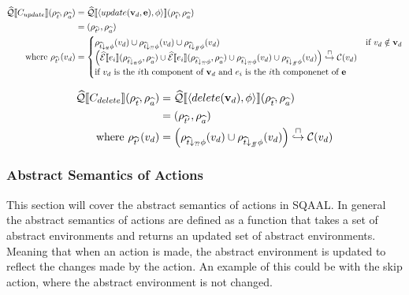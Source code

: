 \begin{align}
    \abssqlsem{C_{update}}(\env{\abstable}, \env{\absvars})
                                              & = \abssqlsem{\langle update(\absattrs, \absexps), \abspred \rangle} (\env{\abstable}, \env{\absvars}) \\
                                              & = (\env{\abstable'}, \env{\absvars})                                                                 \\
    \text{where } \env{\abstable'}(\absattr) & =
    \begin{cases}
        \env{\abstable \downarrow_{\true} \abspred}(\absattr) \cup \env{\abstable \downarrow_{\unknown} \abspred}(\absattr) \cup \env{\abstable \downarrow_{\false} \abspred}(\absattr) & \text{if } \absattr \notin \absattrs \\
        \left( \absexpsem{\absexp{i}}(\env{\abstable \downarrow_{\true} \abspred}, \env{\absvars}) \cup
        \absexpsem{\absexp{i}}(\env{\abstable \downarrow_{\unknown} \abspred}, \env{\absvars}) \cup \env{\abstable \downarrow_{\unknown} \abspred}(\absattr) \cup \env{\abstable \downarrow_{\false} \abspred}(\absattr) \right) \into \lookupcl(v_{d})\\
        \text{if $\absattr$ is the $i$th component of $\absattrs$ and $\absexp{i}$ is the $i$th componenet of $\absexps$} \\
    \end{cases}
\end{align}

\begin{align*}
    \widehat{\mathcal{Q}}\llbracket C_{delete} \rrbracket(\rho_{\widehat{t}}, \rho_{\widehat{a}})
    &= \widehat{\mathcal{Q}}\llbracket \langle delete(\mathbf{v}_d), \phi \rangle \rrbracket (\rho_{\widehat{t}}, \rho_{\widehat{a}}) \\
    &= (\rho_{\widehat{t}'}, \rho_{\widehat{a}}) \\
    \text{where } \rho_{\widehat{t}'}(v_d) &= \left( \rho_{\widehat{t} \downarrow_{?\!?} \phi}(v_d) \cup \rho_{\widehat{t} \downarrow_{f\!\!f} \phi}(v_d) \right) \overset{\sqcap}{\hookrightarrow} \mathcal{C}(v_d)
\end{align*}

\subsubsection{Abstract Semantics of Actions}
This section will cover the abstract semantics of actions in SQAAL.
In general the abstract semantics of actions are defined as a function that takes a set of abstract environments and returns an updated set of abstract environments.
Meaning that when an action is made, the abstract environment is updated to reflect the changes made by the action.
An example of this could be with the skip action, where the abstract environment is not changed.


